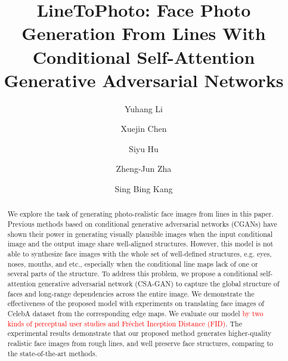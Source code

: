\documentclass[format=acmsmall, review=false, screen=true]{acmart}
\newcommand{\red}{\textcolor{red}}
\begin{document}
\title[LineToPhoto]{LineToPhoto: Face Photo Generation From Lines With Conditional Self-Attention Generative Adversarial Networks}

\author{Yuhang Li}
%
%
\author{Xuejin Chen}
%
%
\author{Siyu Hu}
%
%
\author{Zheng-Jun Zha}
%
%
\author{Sing Bing Kang}

\begin{abstract}
We explore the task of generating photo-realistic face images from lines in this paper.
Previous methods based on conditional generative adversarial networks (CGANs) have shown their power in generating visually plausible images when the input conditional image and the output image share well-aligned structures. 
However, this model is not able to synthesize face images with the whole set of well-defined structures, e.g. eyes, noses, mouths, and etc., especially when the conditional line maps lack of one or several parts of the structure. 
%
To address this problem, we propose a conditional self-attention generative adversarial network (CSA-GAN) to capture the global structure of faces and long-range dependencies across the entire image. 
We demonstrate the effectiveness of the proposed model with experiments on translating face images of CelebA dataset from the corresponding edge maps. 
We evaluate our model \red{by two kinds of perceptual user studies and Fr\'echet Inception Distance (FID)}.
The experimental results demonstrate that our proposed method generates higher-quality realistic face images from rough lines, and well preserve face structures, comparing to the state-of-the-art methods.
\end{abstract}
\end{document}
